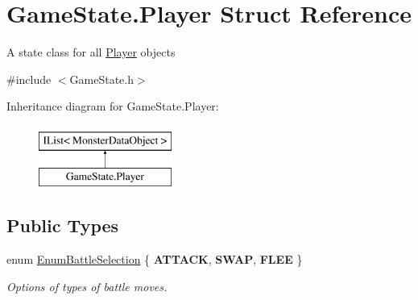 \hypertarget{class_game_state_1_1_player}{\section{Game\-State.\-Player Struct Reference}
\label{class_game_state_1_1_player}
}


A state class for all \hyperlink{class_game_state_1_1_player}{Player} objects  




{\ttfamily \#include $<$Game\-State.\-h$>$}

Inheritance diagram for Game\-State.\-Player\-:\begin{figure}[H]
\begin{center}
\leavevmode
\includegraphics[height=2.000000cm]{class_game_state_1_1_player}
\end{center}
\end{figure}
\subsection*{Public Types}
\begin{DoxyCompactItemize}
\item 
enum \hyperlink{class_game_state_1_1_player_a9f54c5eca1e60acbaa2074e981f51615}{Enum\-Battle\-Selection} \{ {\bfseries A\-T\-T\-A\-C\-K}, 
{\bfseries S\-W\-A\-P}, 
{\bfseries F\-L\-E\-E}
 \}
\begin{DoxyCompactList}\small\item\em Options of types of battle moves. \end{DoxyCompactList}\end{DoxyCompactItemize}
